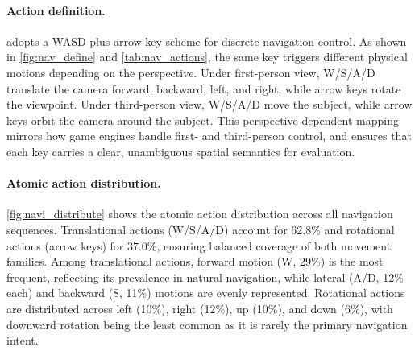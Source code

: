\paragraph{Action definition.}
\benchmark adopts a WASD plus arrow-key scheme for discrete navigation control. As shown in \cref{fig:nav_define} and \cref{tab:nav_actions}, the same key triggers different physical motions depending on the perspective. Under first-person view, W/S/A/D translate the camera forward, backward, left, and right, while arrow keys rotate the viewpoint. Under third-person view, W/S/A/D move the subject, while arrow keys orbit the camera around the subject. This perspective-dependent mapping mirrors how game engines handle first- and third-person control, and ensures that each key carries a clear, unambiguous spatial semantics for evaluation.

\paragraph{Atomic action distribution.}
\cref{fig:navi_distribute} shows the atomic action distribution across all navigation sequences. Translational actions (W/S/A/D) account for 62.8\% and rotational actions (arrow keys) for 37.0\%, ensuring balanced coverage of both movement families. Among translational actions, forward motion (W, 29\%) is the most frequent, reflecting its prevalence in natural navigation, while lateral (A/D, 12\% each) and backward (S, 11\%) motions are evenly represented. Rotational actions are distributed across left (10\%), right (12\%), up (10\%), and down (6\%), with downward rotation being the least common as it is rarely the primary navigation intent.

